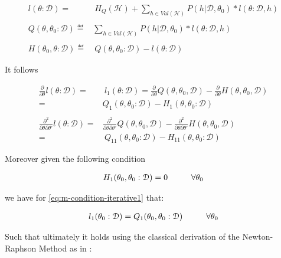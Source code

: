 \documentclass[11pt]{article}
\begin{document}
\begin{article}
\begin{align} \label{eq:likelihood_energy_iterative}
l (\theta: \mathcal{D}) =& \ H_Q (\mathcal{H}) + \sum_{h \in Val(\mathcal{H})} P(h | \mathcal{D}, \theta_0) * l (\theta: \mathcal{D}, h) \\
\nonumber\\
Q(\theta, \theta_0 : \mathcal{D}) \eqdef& \sum_{h \in Val(\mathcal{H})} P(h | \mathcal{D}, \theta_0) * l (\theta: \mathcal{D}, h)\\
\nonumber\\  
H(\theta_0, \theta: \mathcal{D}) \eqdef& \ Q(\theta, \theta_0 : \mathcal{D}) - l (\theta: \mathcal{D}) 
\end{align}

It follows

\begin{align} 
\frac{\partial}{\partial \theta} l (\theta: \mathcal{D}) =& \ l_1 (\theta: \mathcal{D}) = \frac{\partial}{\partial \theta} Q(\theta, \theta_0, \mathcal{D}) - \frac{\partial}{\partial \theta} H(\theta, \theta_0, \mathcal{D}) \nonumber \\
=& Q_1(\theta, \theta_0 : \mathcal{D}) - H_1(\theta, \theta_0 : \mathcal{D})  \label{eq:m-condition-iterative1} \\
\nonumber \\
\frac{\partial^2}{\partial \theta \partial \theta'} l (\theta: \mathcal{D}) =& \frac{\partial^2}{\partial \theta \partial \theta'}  Q(\theta, \theta_0, \mathcal{D}) -  \frac{\partial^2}{\partial \theta \partial \theta'}  H(\theta, \theta_0, \mathcal{D}) \nonumber \\
  =& \ Q_{11}(\theta, \theta_0 : \mathcal{D}) - H_{11}(\theta, \theta_0 : \mathcal{D}) \label{eq:m-condition-iterative2}
\end{align}

Moreover given the following condition

\begin{align} 
 H_1(\theta_0, \theta_0 : \mathcal{D})  = 0 \hspace*{1cm} \forall \theta_0 \label{eq:m-condition-entropy-iterative}
\end{align}

we have for \ref{eq:m-condition-iterative1} that:

\begin{align} 
 l_1(\theta_0: \mathcal{D})  = Q_1(\theta_0, \theta_0: \mathcal{D}) \hspace*{1cm} \forall \theta_0 \label{eq:m-condition-entropy-iterative2} 
\end{align}

Such that ultimately it holds using the classical derivation of the
Newton-Raphson Method as in \cite{storvik2007numerical}:



\end{article}
\end{document}
